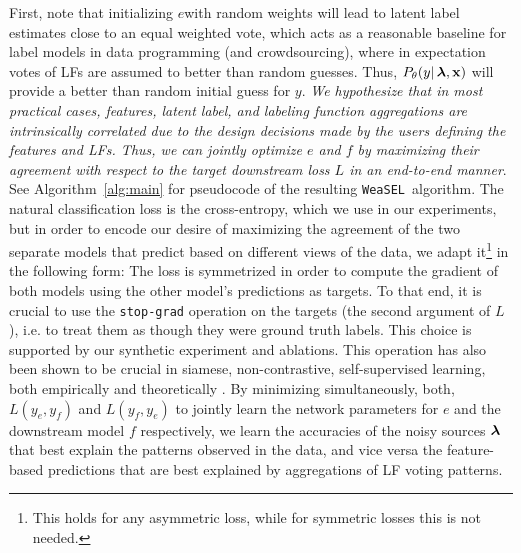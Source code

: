 \documentclass{article}
\newcommand{\weasel}{\texttt{WeaSEL}}\newcommand{\brackets}[1]{\left( #1 \right)}
\newcommand{\encoder}{$e $}
\newcommand{\features}{\mathbf{x}}
\begin{document}
First, note that initializing \encoder  with random weights will lead to latent label estimates close to an equal weighted vote, which acts as a reasonable baseline for label models in data programming (and crowdsourcing), where in expectation votes of LFs are assumed to better than random guesses. Thus, $P_\theta(y |\lfs, \features)$ will provide a better than random initial guess for $y$.
\emph{We hypothesize that in most practical cases, features, latent label, and labeling function aggregations are intrinsically correlated due to the design decisions made by the users defining the features and LFs. Thus, we can jointly optimize $e$ and $f$  by maximizing their agreement with respect to the target downstream loss $L$ in an end-to-end manner}. 
See Algorithm~\ref{alg:main} for pseudocode of the resulting \weasel\  algorithm.
The natural classification loss is the cross-entropy, which we use in our experiments, but in order to encode our desire of maximizing the agreement of the two separate models that predict based on different views of the data, we adapt it\footnote{This holds for any asymmetric loss, while for symmetric losses this is not needed.} in the following form:
The loss is symmetrized in order to compute the gradient of both models using the other model's predictions as targets.
To that end, it is crucial to use the \texttt{stop-grad} operation on the targets (the second argument of $L$), i.e. to treat them as though they were ground truth labels.
This choice is supported by our synthetic experiment and ablations.
This operation has also been shown to be crucial in siamese, non-contrastive, self-supervised learning, both empirically \cite{BYOL, simSiam} and theoretically \cite{tian2021understanding}.
By minimizing simultaneously, both, $L(y_e, y_f)$ and $L(y_f, y_e)$ to jointly learn the network parameters for $e$ and the downstream model $f$ respectively, we learn the accuracies of the noisy sources $\operatorname{\bm{\lambda}}$ that best explain the patterns observed in the data, and vice versa the feature-based predictions that are best explained by aggregations of LF voting patterns.
\end{document}
